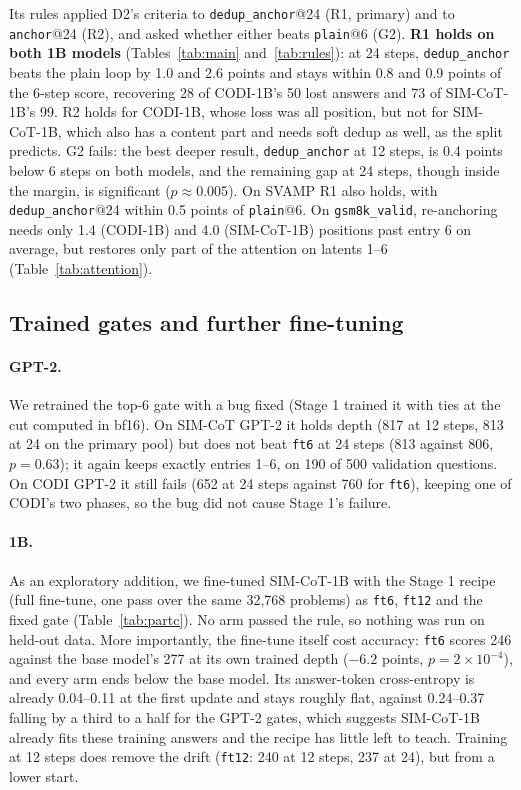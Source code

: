 \documentclass[11pt]{article}
\newcommand{\pol}[1]{\texttt{#1}}
\begin{document}
Its rules applied D2's criteria to \pol{dedup\_anchor}@24 (R1, primary) and to \pol{anchor}@24 (R2), and asked whether
either beats \pol{plain}@6 (G2). \textbf{R1 holds on both 1B models} (Tables~\ref{tab:main} and~\ref{tab:rules}): at 24 steps,
\pol{dedup\_anchor} beats the plain loop by 1.0 and 2.6 points and stays within 0.8 and 0.9 points of the 6-step score,
recovering 28 of CODI-1B's 50 lost answers and 73 of SIM-CoT-1B's 99. R2 holds for CODI-1B, whose loss was all position, but
not for SIM-CoT-1B, which also has a content part and needs soft dedup as well, as the split predicts. G2 fails: the best
deeper result, \pol{dedup\_anchor} at 12 steps, is 0.4 points below 6 steps on both models, and the remaining gap at 24
steps, though inside the margin, is significant ($p \approx 0.005$). On SVAMP R1 also holds, with \pol{dedup\_anchor}@24
within 0.5 points of \pol{plain}@6. On \texttt{gsm8k\_valid}, re-anchoring needs only 1.4 (CODI-1B) and 4.0 (SIM-CoT-1B)
positions past entry 6 on average, but restores only part of the attention on latents 1--6 (Table~\ref{tab:attention}).

\subsection{Trained gates and further fine-tuning}

\paragraph{GPT-2.} We retrained the top-6 gate with a bug fixed (Stage 1 trained it with ties at the cut computed in bf16).
On SIM-CoT GPT-2 it holds depth (817 at 12 steps, 813 at 24 on the primary pool) but does not beat \pol{ft6} at 24 steps
(813 against 806, $p = 0.63$); it again keeps exactly entries 1--6, on 190 of 500 validation questions. On CODI GPT-2 it still fails (652 at
24 steps against 760 for \pol{ft6}), keeping one of CODI's two phases, so the bug did not cause Stage 1's failure.

\paragraph{1B.} As an exploratory addition, we fine-tuned SIM-CoT-1B with the Stage 1 recipe (full fine-tune, one pass over
the same 32,768 problems) as \pol{ft6}, \pol{ft12} and the fixed gate (Table~\ref{tab:partc}). No arm passed the rule, so
nothing was run on held-out data. More importantly, the fine-tune itself cost accuracy: \pol{ft6} scores 246 against the base
model's 277 at its own trained depth ($-6.2$ points, $p = 2 \times 10^{-4}$), and every arm ends below the base model. Its
answer-token cross-entropy is already 0.04--0.11 at the first update and stays roughly flat, against 0.24--0.37 falling by a
third to a half for the GPT-2 gates, which suggests SIM-CoT-1B already fits these training answers and the recipe has
little left to teach. Training at 12 steps does remove the drift (\pol{ft12}: 240 at 12 steps, 237 at 24), but from a lower
start.
\end{document}

